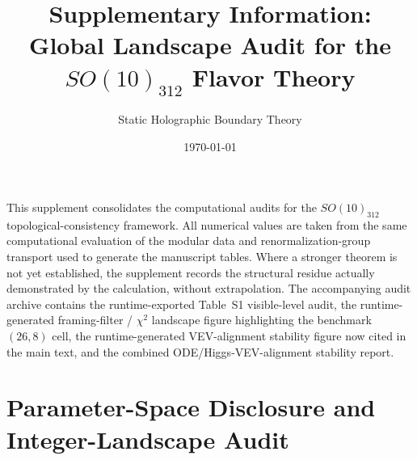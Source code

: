 \documentclass[11pt]{article}
\title{Supplementary Information:\\Global Landscape Audit for the $SO(10)_{312}$ Flavor Theory}
\author{Static Holographic Boundary Theory}
\date{\today}
\begin{document}
\maketitle

This supplement consolidates the computational audits for the $SO(10)_{312}$ topological-consistency framework. All numerical values are taken from the same computational evaluation of the modular data and renormalization-group transport used to generate the manuscript tables. Where a stronger theorem is not yet established, the supplement records the structural residue actually demonstrated by the calculation, without extrapolation. The accompanying audit archive contains the runtime-exported Table~S1 visible-level audit, the runtime-generated framing-filter / $\chi^2$ landscape figure highlighting the benchmark $(26,8)$ cell, the runtime-generated VEV-alignment stability figure now cited in the main text, and the combined ODE/Higgs-VEV-alignment stability report. %

\section{Parameter-Space Disclosure and Integer-Landscape Audit}
\end{document}
